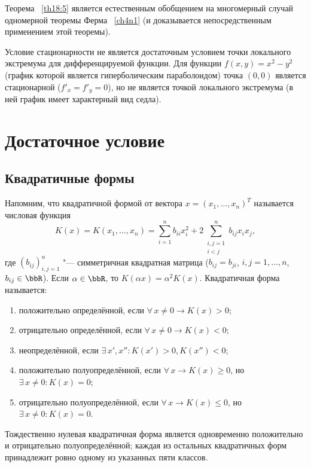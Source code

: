 Теорема ~\ref{th18:5} является естественным обобщением на многомерный случай одномерной теоремы Ферма ~\ref{ch4n1} (и доказывается непосредственным применением этой теоремы).

\begin{notion}
Условие стационарности не является достаточным условием точки локального экстремума для дифференцируемой функции. Для функции $f(x, y) = x^2 - y^2$ (график которой является гиперболическим параболоидом) точка $(0, 0)$ является стационарной ($f'_x = f'_y = 0$), но не является точкой локального экстремума (в ней график имеет характерный вид седла).
\end{notion} 


\section{Достаточное условие}
\subsection{Квадратичные формы}

Напомним, что квадратичной формой от вектора $x = (x_1, \ldots, x_n)^T$ называется числовая функция
$$
K(x) = K(x_1, \ldots, x_n) = \sum_{i=1}^n b_{ii}x_i^2 + 2\sum_{\substack{i,j=1 \\ i<j}}^n b_{ij}x_ix_j,
$$
где $(b_{ij})_{i,j=1}^n$ "--- симметричная квадратная матрица ($b_{ij} = b_{ji}$, $i, j = 1, \ldots, n$, $b_{ij} \in \bbR$). Если $\alpha \in \bbR$, то $K(\alpha x) = \alpha^2 K(x)$. Квадратичная форма называется:
\begin{enumerate}
    \item[1)] положительно определённой, если $\forall\, x \ne 0 \longrightarrow K(x) > 0$;
    \item[2)] отрицательно определённой, если $\forall\, x \ne 0 \longrightarrow K(x) < 0$;
    \item[3)] неопределённой, если $\exists\, x', x'' \colon K(x') > 0, K(x'') < 0$;
    \item[4)] положительно полуопределённой, если $\forall\, x \longrightarrow K(x) \ge 0$, но $\exists\, x \ne 0 \colon K(x) = 0$;
    \item[5)] отрицательно полуопределённой, если $\forall\, x \longrightarrow K(x) \le 0$, но $\exists\, x \ne 0 \colon K(x) = 0$.
\end{enumerate}
Тождественно нулевая квадратичная форма является одновременно положительно и отрицательно полуопределённой; каждая из остальных квадратичных форм принадлежит ровно одному из указанных пяти классов.

